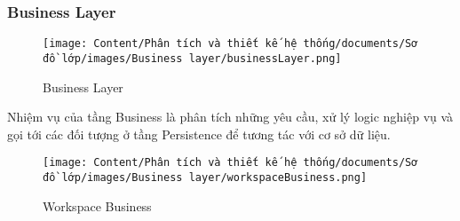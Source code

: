 \subsubsection{Business Layer}

\begin{figure}[H]
    \centering
    \texttt{[image: Content/Phân tích và thiết kế hệ thống/documents/Sơ đồ lớp/images/Business layer/businessLayer.png]}
    \vspace{0.5cm}
    \caption{Business Layer}
    \label{fig:Business Layer}
\end{figure}

Nhiệm vụ của tầng Business là phân tích những yêu cầu, xử lý logic nghiệp vụ và
gọi tới các đối tượng ở tầng Persistence để tương tác với cơ sở dữ liệu.

\begin{figure}[H]
    \centering
    \texttt{[image: Content/Phân tích và thiết kế hệ thống/documents/Sơ đồ lớp/images/Business layer/workspaceBusiness.png]}
    \vspace{0.5cm}
    \caption{Workspace Business}
    \label{fig:Workspace Business}
\end{figure}

